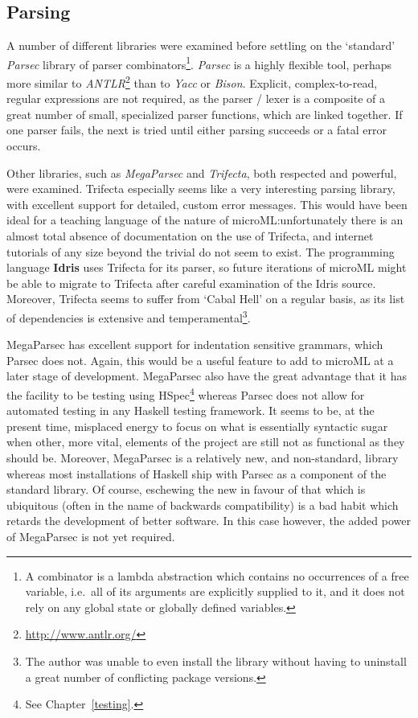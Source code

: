 \documentclass[12pt, a4paper]{report}
\begin{document}
\subsection{Parsing}
\label{parsing}
A number of different libraries were examined before settling on the `standard' \textit{Parsec}
library of parser combinators\footnote{A combinator is a lambda abstraction which contains no
occurrences of a free variable, i.e.\ all of its arguments are explicitly supplied to it, and it
does not rely on any global state or globally defined variables.}. \textit{Parsec} is a highly
flexible tool, perhaps more similar to \textit{ANTLR}\footnote{\url{http://www.antlr.org/}} than
to \textit{Yacc} or \textit{Bison}. Explicit, complex-to-read, regular expressions are not required, as the parser
/ lexer is a composite of a great number of small, specialized parser functions, which are linked
together. If one parser fails, the next is tried until either parsing succeeds or a fatal error
occurs.

Other libraries, such as \textit{MegaParsec} and \textit{Trifecta}, both respected and powerful,
were examined. Trifecta especially seems like a very interesting parsing library, with excellent
support for detailed, custom error messages. This would have been ideal for a teaching language
of the nature of microML:\@ unfortunately there is an almost total absence of documentation on the
use of Trifecta, and internet tutorials of any size beyond the trivial do not seem to exist. The
programming language \textbf{Idris} uses Trifecta for its parser, so future iterations of microML
might be able to migrate to Trifecta after careful examination of the Idris source. Moreover,
Trifecta seems to suffer from `Cabal Hell' on a regular basis, as its list of dependencies is
extensive and temperamental\footnote{The author was unable to even install the library without
having to uninstall a great number of conflicting package versions.}.

MegaParsec has excellent support for indentation sensitive grammars, which Parsec does not. Again,
this would be a useful feature to add to microML at a later stage of development. MegaParsec
also have the great advantage that it has the facility to be testing using HSpec\footnote{See
Chapter~\ref{testing}.} whereas Parsec does not allow for automated testing in any Haskell
testing framework. It seems to be, at the present time, misplaced energy to focus on what
is essentially syntactic sugar when other, more vital, elements of the project are still not
as functional as they should be. Moreover, MegaParsec is a relatively new,
and non-standard, library whereas most installations of Haskell ship with Parsec as a component of
the standard library. Of course, eschewing the new in favour of that which is ubiquitous (often
in the name of backwards compatibility) is a bad habit which retards the development of better
software. In this case however, the added power of MegaParsec is not yet required.
\end{document}
